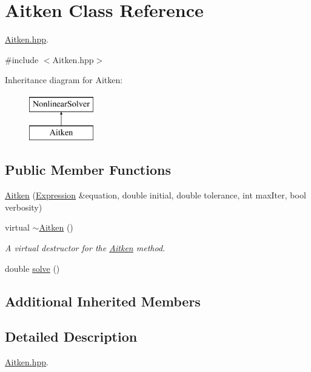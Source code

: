 \hypertarget{class_aitken}{}\section{Aitken Class Reference}
\label{class_aitken}


\hyperlink{_aitken_8hpp_source}{Aitken.\+hpp}.  




{\ttfamily \#include $<$Aitken.\+hpp$>$}

Inheritance diagram for Aitken\+:\begin{figure}[H]
\begin{center}
\leavevmode
\includegraphics[height=2.000000cm]{class_aitken}
\end{center}
\end{figure}
\subsection*{Public Member Functions}
\begin{DoxyCompactItemize}
\item 
\hyperlink{class_aitken_a4a67b211a085f7acbc059575427b543b}{Aitken} (\hyperlink{class_expression}{Expression} \&equation, double initial, double tolerance, int max\+Iter, bool verbosity)
\item 
virtual \hyperlink{class_aitken_a1d89b3f0a4748c6aa71fa6324707f93b}{$\sim$\+Aitken} ()\hypertarget{class_aitken_a1d89b3f0a4748c6aa71fa6324707f93b}{}\label{class_aitken_a1d89b3f0a4748c6aa71fa6324707f93b}

\begin{DoxyCompactList}\small\item\em A virtual destructor for the \hyperlink{class_aitken}{Aitken} method. \end{DoxyCompactList}\item 
double \hyperlink{class_aitken_a2fc0237c34ae1d84e02f92d1d28614e9}{solve} ()
\end{DoxyCompactItemize}
\subsection*{Additional Inherited Members}


\subsection{Detailed Description}
\hyperlink{_aitken_8hpp_source}{Aitken.\+hpp}. 

